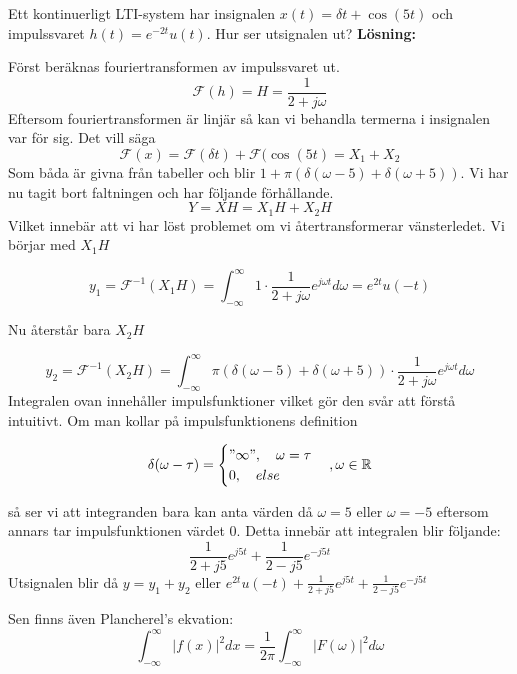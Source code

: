 \documentclass{article}
\begin{document}
Ett kontinuerligt LTI-system har insignalen $x(t)=\delta{t} + \cos(5 t)$
och impulssvaret $h(t) = e^{-2 t} u(t)$. Hur ser utsignalen ut?
\textbf{Lösning:}

Först beräknas fouriertransformen av impulssvaret ut.
$$\mathcal{F}(h) = H = \frac{1}{2+j \omega}$$
Eftersom fouriertransformen är linjär så kan vi behandla termerna i
insignalen var för sig. Det vill säga
$$\mathcal{F} (x) = \mathcal{F}(\delta{t}) + \mathcal{F}(\cos(5 t) = X_1 + X_2$$
Som båda är givna från tabeller och blir
$1+\pi(\delta(\omega - 5) + \delta(\omega + 5))$.
Vi har nu tagit bort faltningen och har följande förhållande.
$$Y = X H = X_1 H + X_2 H$$
Vilket innebär att vi har löst problemet om vi återtransformerar vänsterledet.
Vi börjar med $X_1 H$

$$y_1=\mathcal{F}^{-1}(X_1 H) =  \int_{-\infty}^{\infty} 1 \cdot \frac{1}{2+j \omega} e^{j \omega t} d\omega = e^{2 t} u(-t)$$

Nu återstår bara $X_2 H$

$$
  y_2=\mathcal{F}^{-1}(X_2 H) = \int_{-\infty}^{\infty} \pi(\delta(\omega - 5)
  + \delta(\omega + 5)) \cdot \frac{1}{2+j \omega} e^{j \omega t} d\omega
$$
Integralen ovan innehåller impulsfunktioner vilket gör den svår att förstå
intuitivt. Om man kollar på impulsfunktionens definition

$$
\delta(\omega - \tau)=
\begin{cases}
"\infty",\quad \omega = \tau \\
0, \quad else
\end{cases}, \omega \in \mathbb{R}
$$

så ser vi att integranden bara kan anta värden då $\omega=5$ eller $\omega =-5$
eftersom annars tar impulsfunktionen värdet 0.
Detta innebär att integralen blir följande:
$$\frac{1}{2+j 5} e^{j 5 t} + \frac{1}{2-j 5} e^{-j 5 t}$$
Utsignalen blir då $y=y_1 + y_2$ eller
$e^{2 t} u(-t) + \frac{1}{2+j 5} e^{j 5 t} + \frac{1}{2-j 5} e^{-j 5 t}$

Sen finns även Plancherel's ekvation: %
$$\int_{-\infty}^{\infty} |f(x)|^2 dx =
\frac{1}{2 \pi}\int_{-\infty}^{\infty} |F(\omega)|^2 d\omega$$
\end{document}
